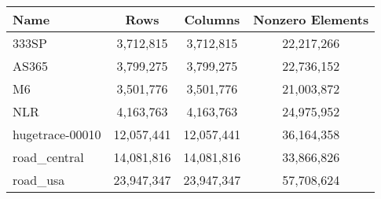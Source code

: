 \begin{tabular}[c]{| l | c | c | c |} 
\hline 
Name & Rows & Columns & Nonzero Elements \\ \hline
333SP & 3,712,815 & 3,712,815 & 22,217,266 \\ \hline
AS365 & 3,799,275 & 3,799,275 & 22,736,152 \\ \hline
M6 & 3,501,776 & 3,501,776 & 21,003,872 \\ \hline
NLR & 4,163,763 & 4,163,763 & 24,975,952 \\ \hline
hugetrace-00010 & 12,057,441 & 12,057,441 & 36,164,358 \\ \hline
road\_central & 14,081,816 & 14,081,816 & 33,866,826 \\ \hline
road\_usa & 23,947,347 & 23,947,347 & 57,708,624\\ \hline
\end{tabular}

